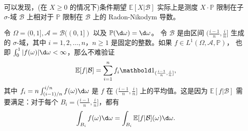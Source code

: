 可以发现，(在 $X\geq 0$ 的情况下)条件期望 $\mathbb{E}[X|\mathcal{B}]$ 实际上是测度 $X\cdot \mathbb{P}$
限制在子 $\sigma$-域 $\mathcal{B}$ 上相对于 $\mathbb{P}$ 限制在 $\mathcal{B}$ 上的
Radon-Nikodym 导数。

\begin{example}
  令 $\Omega=(0,1],\mathcal{A}=\mathcal{B}((0,1])$ 以及 $\mathbb{P}(\d\omega)=\d\omega$。
  令 $\mathcal{B}$ 是由区间 $(\frac{i-1}{n},\frac{i}{n}]$ 生成的 $\sigma$-域，其中
  $i=1,2,\dots,n$，$n\geq 1$ 是固定的整数。如果 $f\in L^1(\Omega,\mathcal{A},\mathbb{P})$，
  也即 $\int_0^1 |f(\omega)| \d\omega<\infty$，那么不难验证
  \[
    \mathbb{E}[f| \mathcal{B}]=\sum_{i=1}^n f_i \idf_{(\frac{i-1}{n},\frac{i}{n}]},
  \]
  其中 $f_i=n\int_{(i-1)/n}^{i/n}f(\omega)\d\omega$ 是 $f$ 在 $(\frac{i-1}{n},\frac{i}{n}]$
  上的平均值。这是因为 $\mathbb{E}[f|\mathcal{B}]$ 需要满足：对于每个 
  $B_i=(\frac{i-1}{n},\frac{i}{n}]$，都有
  \[
    \int_{B_i} f(\omega)\d\omega=\int_{B_i} \mathbb{E}[f|\mathcal{B}](\omega)\d\omega.
  \]
\end{example}

